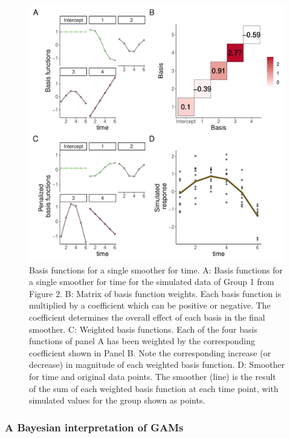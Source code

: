 \documentclass[
]{article}
\begin{document}
\begin{figure}

{\centering \includegraphics[width=0.75\linewidth]{SIM_Appendix_files/figure-latex/basis-plot-1} 

}

\caption{Basis functions for a single smoother for time. A: Basis functions for a single smoother for time for the simulated data of Group 1 from Figure 2. B: Matrix of basis function weights. Each basis function is multiplied by a coefficient which can be positive or negative. The coefficient determines the overall effect of each basis in the final smoother. C: Weighted basis functions. Each of the four basis functions of panel A has been weighted by the corresponding coefficient shown in Panel B. Note the corresponding increase (or decrease) in magnitude of each weighted basis function. D: Smoother for time and original data points. The smoother (line) is the result of the sum of each weighted basis function at each time point, with simulated values for the group shown as points.}\label{fig:basis-plot}
\end{figure}

\hypertarget{a-bayesian-interpretation-of-gams}{%
\subsubsection{A Bayesian interpretation of GAMs}\label{a-bayesian-interpretation-of-gams}}
\end{document}
